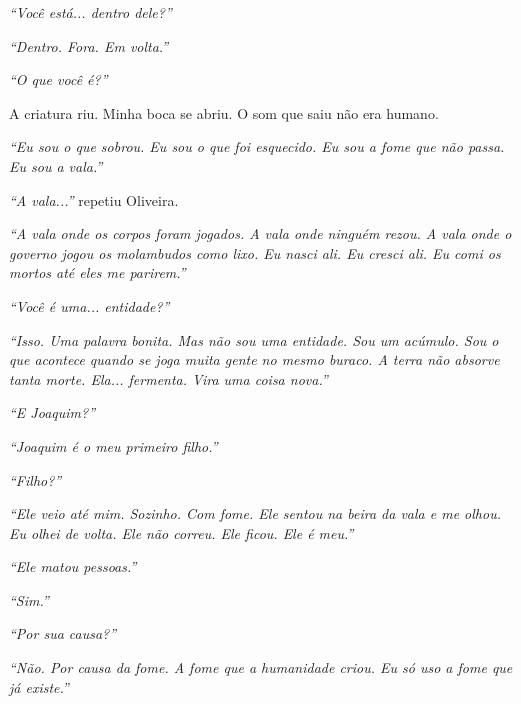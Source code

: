 \noindent \textit{\textquotedblleft{}Você está... dentro dele?\textquotedblright{}}

\noindent \textit{\textquotedblleft{}Dentro. Fora. Em volta.\textquotedblright{}}

\noindent \textit{\textquotedblleft{}O que você é?\textquotedblright{}}

\noindent A criatura riu. Minha boca se abriu. O som que saiu não era humano.

\noindent \textit{\textquotedblleft{}Eu sou o que sobrou. Eu sou o que foi esquecido. Eu sou a fome que não passa. Eu sou a vala.\textquotedblright{}}

\noindent \textit{\textquotedblleft{}A vala...\textquotedblright{}} repetiu Oliveira.

\noindent \textit{\textquotedblleft{}A vala onde os corpos foram jogados. A vala onde ninguém rezou. A vala onde o governo jogou os molambudos como lixo. Eu nasci ali. Eu cresci ali. Eu comi os mortos até eles me parirem.\textquotedblright{}}

\noindent \textit{\textquotedblleft{}Você é uma... entidade?\textquotedblright{}}

\noindent \textit{\textquotedblleft{}Isso. Uma palavra bonita. Mas não sou uma entidade. Sou um acúmulo. Sou o que acontece quando se joga muita gente no mesmo buraco. A terra não absorve tanta morte. Ela... fermenta. Vira uma coisa nova.\textquotedblright{}}

\noindent \textit{\textquotedblleft{}E Joaquim?\textquotedblright{}}

\noindent \textit{\textquotedblleft{}Joaquim é o meu primeiro filho.\textquotedblright{}}

\noindent \textit{\textquotedblleft{}Filho?\textquotedblright{}}

\noindent \textit{\textquotedblleft{}Ele veio até mim. Sozinho. Com fome. Ele sentou na beira da vala e me olhou. Eu olhei de volta. Ele não correu. Ele ficou. Ele é meu.\textquotedblright{}}

\noindent \textit{\textquotedblleft{}Ele matou pessoas.\textquotedblright{}}

\noindent \textit{\textquotedblleft{}Sim.\textquotedblright{}}

\noindent \textit{\textquotedblleft{}Por sua causa?\textquotedblright{}}

\noindent \textit{\textquotedblleft{}Não. Por causa da fome. A fome que a humanidade criou. Eu só uso a fome que já existe.\textquotedblright{}}

